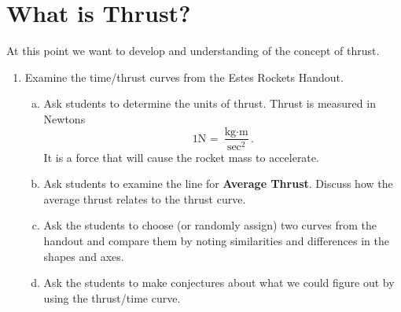 \documentclass [12pt, letterpaper, titlepage] {article}
\begin{document}
\section*{What is Thrust?}
At this point we want to develop and understanding of the concept of thrust.
\begin{enumerate}
\item{Examine the time/thrust curves from the Estes Rockets Handout. 
			\begin{enumerate}[a.]
				\item{Ask students to determine the units of thrust. Thrust is measured in Newtons \textbf{$$ \text{1N = }\frac{\text{kg} \cdot \text{m}}{\text{sec}^2}.$$}  It is a force that will cause the rocket mass to accelerate.}
				\item{Ask students to examine the line for \textbf{Average Thrust}. Discuss how the average thrust relates to the thrust curve.}
				\item{Ask the students to choose (or randomly assign) two curves from the handout and compare them by noting similarities and differences in the shapes and axes.}
				\item{Ask the students to make conjectures about what we could figure out by using the thrust/time curve.}
			\end{enumerate}
		}
\end{enumerate}
\end{document}

